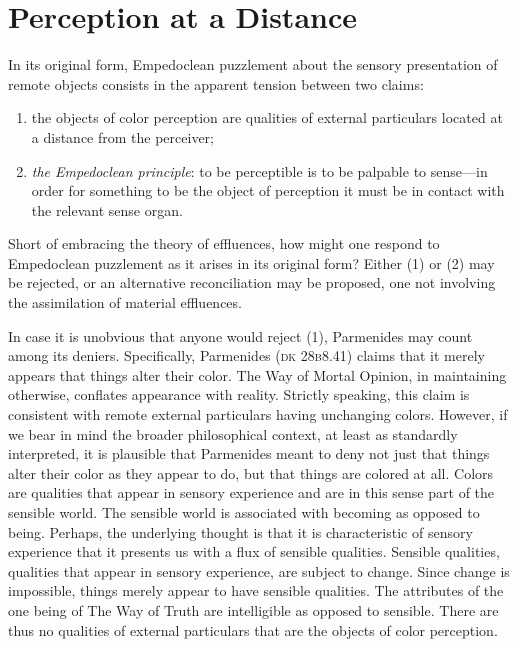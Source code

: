 \chapter{Perception at a Distance} %
\label{cha:perception_at_a_distance}

In its original form, Empedoclean puzzlement about the sensory presentation of remote objects consists in the apparent tension between two claims:
\begin{enumerate}[(1)]
    \item the objects of color perception are qualities of external particulars located at a distance from the perceiver;
    \item \emph{the Empedoclean principle}: to be perceptible is to be palpable to sense---in order for something to be the object of perception it must be in contact with the relevant sense organ.
\end{enumerate}
Short of embracing the theory of effluences, how might one respond to Empedoclean puzzlement as it arises in its original form? Either (1) or (2) may be rejected, or an alternative reconciliation may be proposed, one not involving the assimilation of material effluences.

In case it is unobvious that anyone would reject (1), Parmenides may count among its deniers. Specifically, Parmenides (\textsc{dk} 28\textsc{b}8.41) claims that it merely appears that things alter their color. The Way of Mortal Opinion, in maintaining otherwise, conflates appearance with reality. Strictly speaking, this claim is consistent with remote external particulars having unchanging colors. However, if we bear in mind the broader philosophical context, at least as standardly interpreted, it is plausible that Parmenides meant to deny not just that things alter their color as they appear to do, but that things are colored at all. Colors are qualities that appear in sensory experience and are in this sense part of the sensible world. The sensible world is associated with becoming as opposed to being. Perhaps, the underlying thought is that it is characteristic of sensory experience that it presents us with a flux of sensible qualities. Sensible qualities, qualities that appear in sensory experience, are subject to change. Since change is impossible, things merely appear to have sensible qualities. The attributes of the one being of The Way of Truth are intelligible as opposed to sensible. There are thus no qualities of external particulars that are the objects of color perception.

